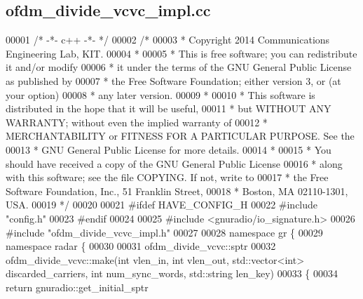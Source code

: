 \subsection{ofdm\+\_\+divide\+\_\+vcvc\+\_\+impl.\+cc}
\label{ofdm__divide__vcvc__impl_8cc_source}

\begin{DoxyCode}
00001 \textcolor{comment}{/* -*- c++ -*- */}
00002 \textcolor{comment}{/* }
00003 \textcolor{comment}{ * Copyright 2014 Communications Engineering Lab, KIT.}
00004 \textcolor{comment}{ * }
00005 \textcolor{comment}{ * This is free software; you can redistribute it and/or modify}
00006 \textcolor{comment}{ * it under the terms of the GNU General Public License as published by}
00007 \textcolor{comment}{ * the Free Software Foundation; either version 3, or (at your option)}
00008 \textcolor{comment}{ * any later version.}
00009 \textcolor{comment}{ * }
00010 \textcolor{comment}{ * This software is distributed in the hope that it will be useful,}
00011 \textcolor{comment}{ * but WITHOUT ANY WARRANTY; without even the implied warranty of}
00012 \textcolor{comment}{ * MERCHANTABILITY or FITNESS FOR A PARTICULAR PURPOSE.  See the}
00013 \textcolor{comment}{ * GNU General Public License for more details.}
00014 \textcolor{comment}{ * }
00015 \textcolor{comment}{ * You should have received a copy of the GNU General Public License}
00016 \textcolor{comment}{ * along with this software; see the file COPYING.  If not, write to}
00017 \textcolor{comment}{ * the Free Software Foundation, Inc., 51 Franklin Street,}
00018 \textcolor{comment}{ * Boston, MA 02110-1301, USA.}
00019 \textcolor{comment}{ */}
00020 
00021 \textcolor{preprocessor}{#ifdef HAVE\_CONFIG\_H}
00022 \textcolor{preprocessor}{#include "config.h"}
00023 \textcolor{preprocessor}{#endif}
00024 
00025 \textcolor{preprocessor}{#include <gnuradio/io\_signature.h>}
00026 \textcolor{preprocessor}{#include "ofdm_divide_vcvc_impl.h"}
00027 
00028 \textcolor{keyword}{namespace }gr \{
00029   \textcolor{keyword}{namespace }radar \{
00030 
00031     ofdm_divide_vcvc::sptr
00032     ofdm_divide_vcvc::make(\textcolor{keywordtype}{int} vlen\_in, \textcolor{keywordtype}{int} vlen\_out, std::vector<int> discarded\_carriers, \textcolor{keywordtype}{int} 
      num\_sync\_words, std::string len\_key)
00033     \{
00034       \textcolor{keywordflow}{return} gnuradio::get\_initial\_sptr

\end{DoxyCode}
